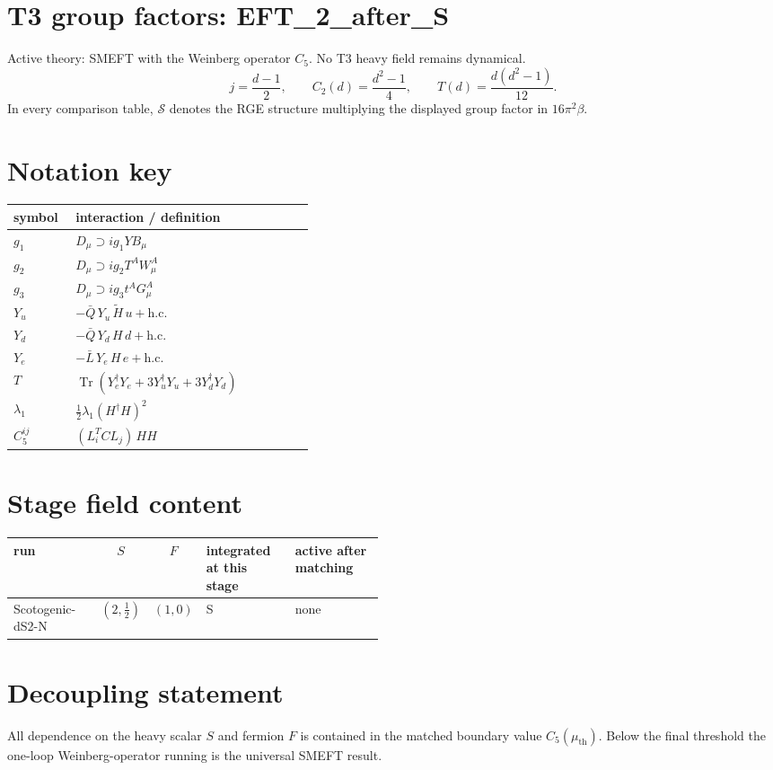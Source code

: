 \documentclass[9pt]{article}
\begin{document}
\section*{T3 group factors: EFT\_2\_after\_S}
Active theory: SMEFT with the Weinberg operator $C_5$.  No T3 heavy field remains dynamical.
\[j=\frac{d-1}{2},\qquad C_2(d)=\frac{d^2-1}{4},\qquad T(d)=\frac{d(d^2-1)}{12}.\]
In every comparison table, $\mathcal{S}$ denotes the RGE structure multiplying the displayed group factor in $16\pi^2\beta$.
\section*{Notation key}
\begin{longtable}{@{}p{0.19\linewidth}p{0.73\linewidth}@{}}
\toprule
symbol & interaction / definition \\
\midrule
$g_1$ & $D_\mu\supset i g_1 Y B_\mu$ \\
$g_2$ & $D_\mu\supset i g_2 T^A W_\mu^A$ \\
$g_3$ & $D_\mu\supset i g_3 t^A G_\mu^A$ \\
$Y_u$ & $-\bar Q\,Y_u\,\widetilde H\,u+\mathrm{h.c.}$ \\
$Y_d$ & $-\bar Q\,Y_d\,H\,d+\mathrm{h.c.}$ \\
$Y_e$ & $-\bar L\,Y_e\,H\,e+\mathrm{h.c.}$ \\
$T$ & $\operatorname{Tr}\!\left(Y_e^\dagger Y_e+3Y_u^\dagger Y_u+3Y_d^\dagger Y_d\right)$ \\
$\lambda_1$ & $\frac12\lambda_1(H^\dagger H)^2$ \\
$C_5^{ij}$ & $(L_i^T C L_j)\,H H$ \\
\bottomrule
\end{longtable}
\section*{Stage field content}
\begin{longtable}{@{}lcc p{0.24\linewidth}p{0.24\linewidth}@{}}
\toprule
run & $S$ & $F$ & integrated at this stage & active after matching \\
\midrule
Scotogenic-dS2-N & $(2,\frac{1}{2})$ & $(1,0)$ & S & none \\
\bottomrule
\end{longtable}
\section*{Decoupling statement}
All dependence on the heavy scalar $S$ and fermion $F$ is contained in the matched boundary value $C_5(\mu_{\mathrm{th}})$.  Below the final threshold the one-loop Weinberg-operator running is the universal SMEFT result.
\end{document}
